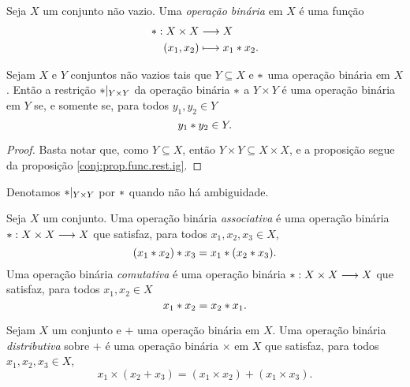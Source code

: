 \begin{defi}
Seja $X$ um conjunto não vazio. Uma \emph{operação binária} em $X$ é uma função
	\begin{align*}
	{\ast}: {X \times X} &\longrightarrow {X} \\{(x_1,x_2)} &\longmapsto {x_1 \ast x_2}.
	\end{align*}
\end{defi}

\begin{prop}
\label{prop:restri.op.bin}
Sejam $X$ e $Y$ conjuntos não vazios tais que $Y \subseteq X$ e $ \ast $ uma operação binária em $X$. Então a restrição $ \ast |_{Y \times Y}$ da operação binária $ \ast $ a $Y \times Y$ é uma operação binária em $Y$ se, e somente se, para todos $y_1,y_2 \in Y$
	\begin{equation*}
	y_1 \ast y_2 \in Y.
	\end{equation*}
\end{prop}
\begin{proof}
Basta notar que, como $Y \subseteq X$, então $Y \times Y \subseteq X \times X$, e a proposição segue da proposição \ref{conj:prop.func.rest.ig}.
\end{proof}

Denotamos $\ast |_{Y \times Y}$ por $\ast$ quando não há ambiguidade.

\begin{defi}
Seja $X$ um conjunto. Uma operação binária \emph{associativa} é uma operação binária $\ast: X \times X \longrightarrow X$ que satisfaz, para todos $x_1,x_2,x_3 \in X$,
	\begin{equation*}
	(x_1 \ast x_2) \ast x_3 = x_1 \ast (x_2 \ast x_3).
	\end{equation*}
Uma operação binária \emph{comutativa} é uma operação binária $\ast : X \times X \longrightarrow X$ que satisfaz, para todos $x_1,x_2 \in X$
	\begin{equation*}
	x_1 \ast x_2 = x_2 \ast x_1.
	\end{equation*}
\end{defi}

\begin{defi}
	Sejam $X$ um conjunto e $+$ uma operação binária em $X$. Uma operação binária \emph{distributiva} sobre $+$ é uma operação binária $\times$ em $X$ que satisfaz, para todos $x_1,x_2,x_3 \in X$,
	\begin{equation*}
	x_1 \times (x_2 + x_3) = (x_1 \times x_2) + (x_1 \times x_3).
	\end{equation*}
\end{defi}

